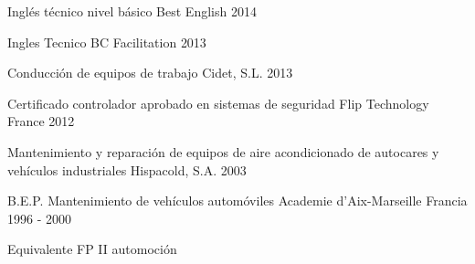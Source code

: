 \begin{cventries}
  \cventry
    {Inglés técnico nivel básico} %
    {Best English} %
    {} %
    {2014} %
    {}

  \cventry
    {Ingles Tecnico} %
    {BC Facilitation} %
    {} %
    {2013} %
    {}

  \cventry
    {Conducción de equipos de trabajo} %
    {Cidet, S.L.} %
    {} %
    {2013} %
    {}

  \cventry
    {Certificado controlador aprobado en sistemas de seguridad} %
    {Flip Technology France} %
    {} %
    {2012} %
    {}

  \cventry
    {Mantenimiento y reparación de equipos de aire acondicionado de autocares y vehículos industriales} %
    {Hispacold, S.A.} %
    {} %
    {2003} %
    {}

  \cventry
    {B.E.P. Mantenimiento de vehículos automóviles} %
    {Academie d’Aix-Marseille} %
    {Francia} %
    {1996 - 2000} %
    {
      \begin{cvitems} %
        \item {Equivalente FP II automoción}
      \end{cvitems}
    }

\end{cventries}
